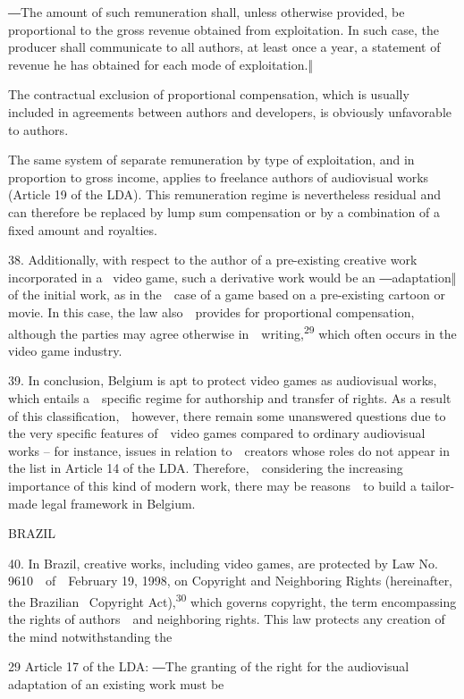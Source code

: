 \documentclass[
]{article}
\begin{document}
{―The amount of such remuneration shall, unless otherwise provided, be
}{proportional to the gross revenue obtained from exploitation. In such
case, the producer shall communicate to all authors, at least once a
year, a }{statement of revenue he has obtained for each mode of
exploitation.‖}

{The contractual exclusion of proportional compensation, which is
usually included in agreements between authors and developers, is
obviously unfavorable to authors.}

{The same system of separate remuneration by type of exploitation, and
in proportion to gross income, applies to freelance authors of
audiovisual works (Article 19 of the LDA). This remuneration regime is
nevertheless residual and can therefore be replaced by lump sum
compensation or by a combination of a fixed amount and royalties.}

{38. }{Additionally, with respect to the author of a pre-existing
creative work incorporated in a }{~video game, such a derivative work
would be an ―}{adaptation‖ }{of the initial work, as in the~~case of a
game based on a pre-existing cartoon or movie. In this case, the law
also~~provides for proportional compensation, although the parties may
agree otherwise in~~writing,}\textsuperscript{{29 }}{which often occurs
in the video game industry.}

{39. }{In conclusion, Belgium is apt to protect video games as
audiovisual works, which entails a~~specific regime for authorship and
transfer of rights. As a result of this classification,~~however, there
remain some unanswered questions due to the very specific features
of~~video games compared to ordinary audiovisual works }{-- }{for
instance, issues in relation to~~creators whose roles do not appear in
the list in Article 14 of the LDA. Therefore,~~considering the
increasing importance of this kind of modern work, there may be
reasons~~to build a tailor-made legal framework in Belgium.}

{BRAZIL}

{40. }{In Brazil, creative works, including video games, are protected
by }{Law No. 9610~~of~~February 19, 1998, on Copyright and Neighboring
Rights }{(hereinafter, the Brazilian }{~Copyright
Act}{)}{,}\textsuperscript{{30 }}{which governs copyright, the term
encompassing the rights of authors~~and neighboring rights. This law
protects any creation of the mind notwithstanding the}

{29 }{Article 17 of the LDA: }{―}{The granting of the right for the
audiovisual adaptation of an existing work must be}
\end{document}
